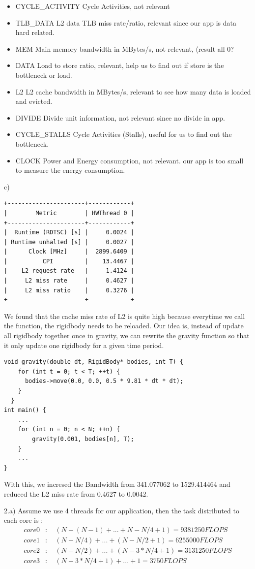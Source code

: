\documentclass[article]{scrartcl}
\begin{document}
\begin{itemize}
    \item CYCLE\_ACTIVITY  Cycle Activities, not relevant
    \item TLB\_DATA  L2 data TLB miss rate/ratio, relevant since our app is data hard related.
    \item MEM  Main memory bandwidth in MBytes/s, not relevant, (result all 0?
    \item DATA  Load to store ratio, relevant, help us to find out if store is the bottleneck or load.
    \item L2  L2 cache bandwidth in MBytes/s, relevant to see how many data is loaded and evicted.
    \item DIVIDE  Divide unit information, not relevant since no divide in app.
    \item CYCLE\_STALLS  Cycle Activities (Stalls), useful for us to find out the bottleneck.
    \item CLOCK  Power and Energy consumption, not relevant. our app is too small to measure the energy consumption.
\end{itemize}
c)
\begin{lstlisting}
+----------------------+------------+
|        Metric        | HWThread 0 |
+----------------------+------------+
|  Runtime (RDTSC) [s] |     0.0024 |
| Runtime unhalted [s] |     0.0027 |
|      Clock [MHz]     |  2899.6409 |
|          CPI         |    13.4467 |
|    L2 request rate   |     1.4124 |
|     L2 miss rate     |     0.4627 |
|     L2 miss ratio    |     0.3276 |
+----------------------+------------+
\end{lstlisting}

We found that the cache miss rate of L2 is quite high because everytime we call the function, the rigidbody needs to be reloaded. Our idea is, instead of update all rigidbody together once in gravity, we can rewrite the gravity function so that it only update one rigidbody for a given time period.\\
\begin{lstlisting}
void gravity(double dt, RigidBody* bodies, int T) {
    for (int t = 0; t < T; ++t) {
      bodies->move(0.0, 0.0, 0.5 * 9.81 * dt * dt);
    }
  }
int main() {
    ...
    for (int n = 0; n < N; ++n) {
        gravity(0.001, bodies[n], T);
    }
    ...
}
\end{lstlisting}
With this, we incresed the Bandwidth from 341.077062 to 1529.414464 and reduced the L2 miss rate from 0.4627 to 0.0042.

2.a) Assume we use 4 threads for our application, then the task distributed to each core is :
\begin{align*}
    core 0&: \quad (N+(N-1)+...+N-N/4 +1)=9381250 FLOPS\\
    core1&: \quad (N-N/4)+...+(N-N/2+1)=6255000FLOPS\\
    core 2&:  \quad (N-N/2)+...+(N-3*N/4+1) = 3131250FLOPS\\
    core 3&: \quad (N-3*N/4+1) + ... +1 = 3750FLOPS
\end{align*}
\end{document}
